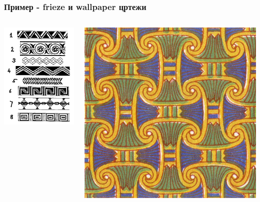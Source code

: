 \documentclass{beamer}
\theoremstyle{plain}
\theoremstyle{definition}
\begin{document}
\begin{frame}
\frametitle{Пример - frieze и wallpaper цртежи}
\begin{columns}[T]
    \begin{column}{0.5\textwidth}
      \centering
      \includegraphics[height=\textwidth]{frieze}
    \end{column}
    \begin{column}{0.5\textwidth}
      \centering
      \includegraphics[width=\textwidth]{wallpaper}
    \end{column}
\end{columns}
\end{frame}
\end{document}
